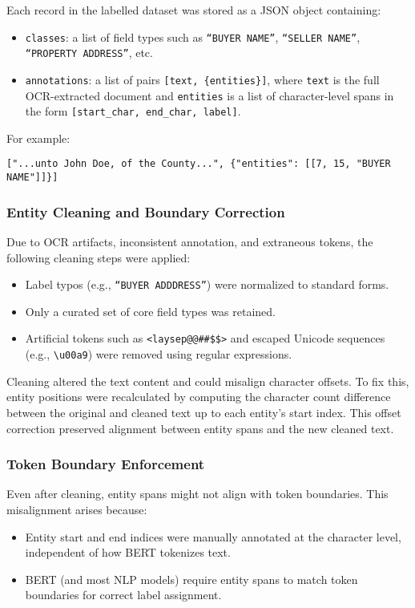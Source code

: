 \documentclass{article}
\begin{document}
Each record in the labelled dataset was stored as a JSON object containing:
\begin{itemize}
    \item \texttt{classes}: a list of field types such as \texttt{``BUYER NAME''}, \texttt{``SELLER NAME''}, \texttt{``PROPERTY ADDRESS''}, etc.
    \item \texttt{annotations}: a list of pairs \texttt{[text, \{entities\}]}, where \texttt{text} is the full OCR-extracted document and \texttt{entities} is a list of character-level spans in the form \texttt{[start\_char, end\_char, label]}.
\end{itemize}

For example:
\begin{verbatim}
["...unto John Doe, of the County...", {"entities": [[7, 15, "BUYER NAME"]]}]
\end{verbatim}

\subsubsection{Entity Cleaning and Boundary Correction}

Due to OCR artifacts, inconsistent annotation, and extraneous tokens, the following cleaning steps were applied:
\begin{itemize}
    \item Label typos (e.g., \texttt{``BUYER ADDDRESS''}) were normalized to standard forms.
    \item Only a curated set of core field types was retained.
    \item Artificial tokens such as \verb|<laysep@@##$$>| and escaped Unicode sequences (e.g., \verb|\u00a9|) were removed using regular expressions.
\end{itemize}

Cleaning altered the text content and could misalign character offsets. To fix this, entity positions were recalculated by computing the character count difference between the original and cleaned text up to each entity's start index. This offset correction preserved alignment between entity spans and the new cleaned text.

\subsubsection{Token Boundary Enforcement}

Even after cleaning, entity spans might not align with token boundaries. This misalignment arises because:
\begin{itemize}
    \item Entity start and end indices were manually annotated at the character level, independent of how BERT tokenizes text.
    \item BERT (and most NLP models) require entity spans to match token boundaries for correct label assignment.
\end{itemize}
\end{document}
